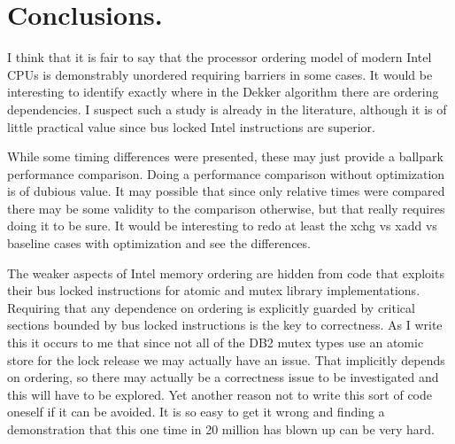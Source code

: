 \section{Conclusions.}

I think that it is fair to say that the processor ordering model of modern Intel CPUs is demonstrably unordered requiring barriers in some cases.  It would be interesting to identify exactly where in the Dekker algorithm there are ordering dependencies.  I suspect such a study is already in the literature, although it is of little practical value since bus locked Intel instructions are superior.  

While some timing differences were presented, these may just provide a ballpark performance comparison.  Doing a performance comparison without optimization is of dubious value.  It may possible that since only relative times were compared there may be some validity to the comparison otherwise, but that really requires doing it to be sure.  It would be interesting to redo at least the xchg vs xadd vs baseline cases with optimization and see the differences.

The weaker aspects of Intel memory ordering are hidden from code that exploits their bus locked instructions for atomic and mutex library implementations.  Requiring that any dependence on ordering is explicitly guarded by critical sections bounded by bus locked instructions is the key to correctness.  As I write this it occurs to me that since not all of the DB2 mutex types use an atomic store for the lock release we may actually have an issue.  That implicitly depends on ordering, so there may actually be a correctness issue to be investigated and this will have to be explored.  Yet another reason not to write this sort of code oneself if it can be avoided.  It is so easy to get it wrong and finding a demonstration that this one time in 20 million has blown up can be very hard.

\EndArticle
